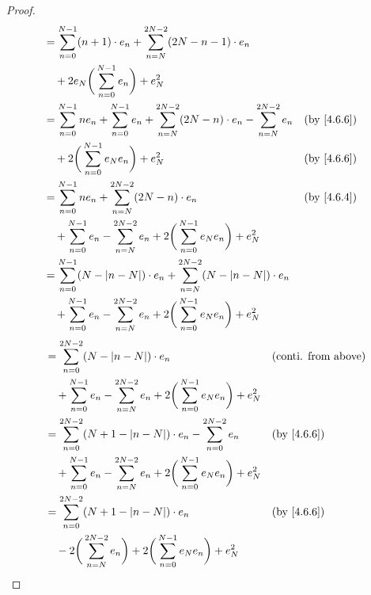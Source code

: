 \begin{proof}
\begin{align*}
     & = \sum_{n = 0}^{N - 1} (n + 1) \cdot e_n + \sum_{n = N}^{2N - 2} (2N - n - 1) \cdot e_n                                                        \\
     & \quad + 2 e_N \bigg(\sum_{n = 0}^{N - 1} e_n\bigg) + e_N^2                                                                                     \\
     & = \sum_{n = 0}^{N - 1} n e_n + \sum_{n = 0}^{N - 1} e_n + \sum_{n = N}^{2N - 2} (2N - n) \cdot e_n - \sum_{n = N}^{2N - 2} e_n &  & \by{4.6.6} \\
     & \quad + 2 \bigg(\sum_{n = 0}^{N - 1} e_N e_n\bigg) + e_N^2                                                                     &  & \by{4.6.6} \\
     & = \sum_{n = 0}^{N - 1} n e_n + \sum_{n = N}^{2N - 2} (2N - n) \cdot e_n                                                        &  & \by{4.6.4} \\
     & \quad + \sum_{n = 0}^{N - 1} e_n - \sum_{n = N}^{2N - 2} e_n + 2 \bigg(\sum_{n = 0}^{N - 1} e_N e_n\bigg) + e_N^2                              \\
     & = \sum_{n = 0}^{N - 1} (N - \abs{n - N}) \cdot e_n + \sum_{n = N}^{2N - 2} (N - \abs{n - N}) \cdot e_n                                         \\
     & \quad + \sum_{n = 0}^{N - 1} e_n - \sum_{n = N}^{2N - 2} e_n + 2 \bigg(\sum_{n = 0}^{N - 1} e_N e_n\bigg) + e_N^2
  \end{align*}
  \begin{align*}
     & = \sum_{n = 0}^{2N - 2} (N - \abs{n - N}) \cdot e_n                                                               &  & \text{(conti. from above)}   \\
     & \quad + \sum_{n = 0}^{N - 1} e_n - \sum_{n = N}^{2N - 2} e_n + 2 \bigg(\sum_{n = 0}^{N - 1} e_N e_n\bigg) + e_N^2                                   \\
     & = \sum_{n = 0}^{2N - 2} (N + 1 - \abs{n - N}) \cdot e_n - \sum_{n = 0}^{2N - 2} e_n                               &  & \by{4.6.6}                   \\
     & \quad + \sum_{n = 0}^{N - 1} e_n - \sum_{n = N}^{2N - 2} e_n + 2 \bigg(\sum_{n = 0}^{N - 1} e_N e_n\bigg) + e_N^2                                   \\
     & = \sum_{n = 0}^{2N - 2} (N + 1 - \abs{n - N}) \cdot e_n                                                           &  & \by{4.6.6}                   \\
     & \quad - 2 \bigg(\sum_{n = N}^{2N - 2} e_n\bigg) + 2 \bigg(\sum_{n = 0}^{N - 1} e_N e_n\bigg) + e_N^2                                                \\

\end{align*}
\end{proof}
